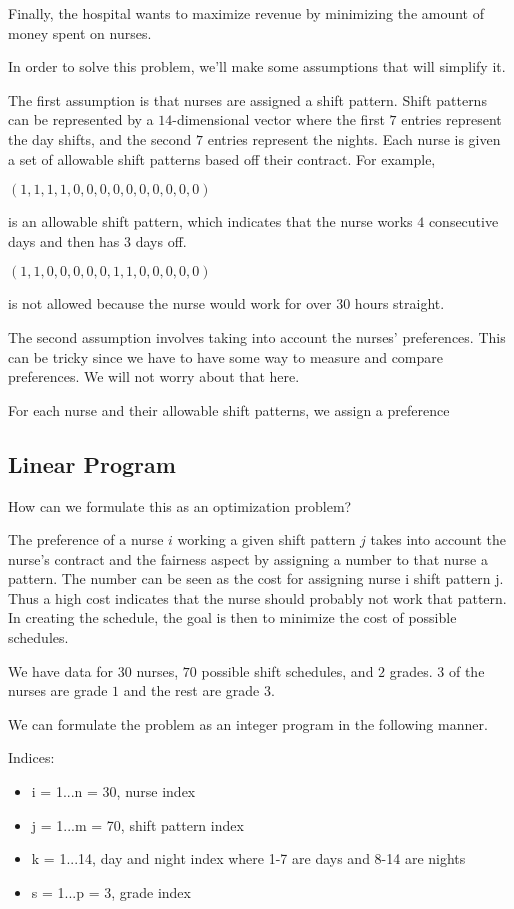 Finally, the hospital wants to maximize revenue by minimizing the amount of money spent on nurses. 



In order to solve this problem, we'll make some assumptions that will simplify it. 

The first assumption is that nurses are assigned a shift pattern.
Shift patterns can be represented by a $14$-dimensional vector where the first $7$ entries represent the day shifts, and the second $7$ entries represent the nights. Each nurse is given a set of allowable shift patterns based off their contract.
For example, 
\begin{center}
$(1,1,1,1,0,0,0,0,0,0,0,0,0,0)$
\end{center}
is an allowable shift pattern, which indicates that the nurse works $4$ consecutive days and then has $3$ days off. 
\begin{center}
$(1,1,0,0,0,0,0,1,1,0,0,0,0,0)$
\end{center}
is not allowed because the nurse would work for over $30$ hours straight.

The second assumption involves taking into account the nurses' preferences. This can be tricky since we have to have some way to measure and compare preferences. We will not worry about that here. 

For each nurse and their allowable shift patterns, we assign
a preference

\subsection*{Linear Program}
How can we formulate this as an optimization problem?

The preference of a nurse $i$ working a given shift pattern $j$ takes into account the nurse's contract and the fairness aspect by assigning a number to that nurse a pattern. The number can be seen as the cost for assigning nurse i shift pattern j. 
Thus a high cost indicates that the nurse should probably not work that pattern. In creating the schedule, the goal is then to minimize the cost of possible schedules. 


We have data for $30$ nurses, $70$ possible shift schedules, and $2$ grades.  $3$ of the nurses are grade $1$ and the rest are grade $3$. 

We can formulate the problem as an integer program in the following manner.


Indices:
\begin{itemize}
\item i = 1...n = 30, nurse index
\item j = 1...m = 70, shift pattern index
\item k = 1...14, day and night index where 1-7 are days and 8-14 are nights
\item s = 1...p = 3, grade index 
\end{itemize}

